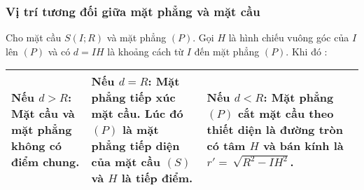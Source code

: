 \begin{khung}
\subsubsection{Vị trí tương đối giữa mặt phẳng và mặt cầu}
	Cho mặt cầu $S(I;R)$ và mặt phẳng $(P)$. Gọi $H$ là hình chiếu vuông góc của $I$ lên $(P)$ và có $d=IH$ là khoảng cách từ $I$ đến mặt phẳng $(P)$. Khi đó : \\
	\begin{tabular}{|m{4cm}|m{5cm}|m{5cm}|}
		\hline
		Nếu $d>R$: Mặt cầu và mặt phẳng không có điểm chung. & Nếu $d=R$: Mặt phẳng tiếp xúc mặt cầu. Lúc đó $(P)$ là mặt phẳng tiếp diện của mặt cầu $(S)$ và $H$ là tiếp điểm. & Nếu $d<R$: Mặt phẳng $(P)$ cắt mặt cầu theo thiết diện là đường tròn có tâm $H$ và bán kính là $r'=~\sqrt{R^2-IH^2}$.\\
		\hline

\end{tabular}
\end{khung}
